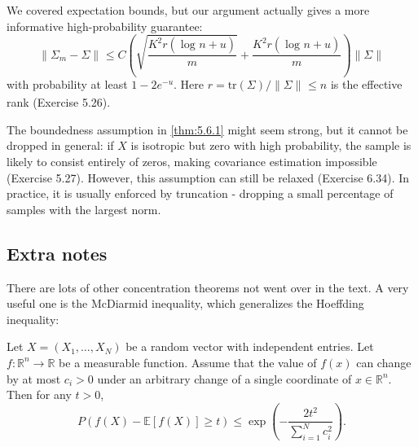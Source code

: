 \begin{remark}
\label{rmk:5.6.5}
We covered expectation bounds, but our argument actually gives a more informative high-probability guarantee:
\[ \lVert \Sigma_m - \Sigma \rVert_{} \leq C \left( 
\sqrt{\frac{K^2 r (\log_{}{n} + u)}{m}} + \frac{K^2 r (\log_{}{n} + u)}{m}\right) \lVert \Sigma \rVert_{} \]
with probability at least $1 - 2e^{-u}$. Here $r = \mathrm{tr}(\Sigma) / \lVert \Sigma \rVert_{} \leq n$ is 
the effective rank (Exercise 5.26).
\end{remark}

\begin{remark}
\label{rmk:5.6.6}
The boundedness assumption in \cref{thm:5.6.1} might seem strong, but it cannot be dropped in general: if $X$ 
is isotropic but zero with high probability, the sample is likely to consist entirely of zeros, making 
covariance estimation impossible (Exercise 5.27). However, this assumption can still be relaxed (Exercise 6.34). 
In practice, it is usually enforced by truncation - dropping a small percentage of samples with the largest norm.
\end{remark}



\subsection{Extra notes}
There are lots of other concentration theorems not went over in the text. A very useful one is the McDiarmid 
inequality, which generalizes the Hoeffding inequality:

\begin{theorem}
\label{thm:5.7.1}
Let $X = (X_1, \dots, X_N)$ be a random vector with independent entries. Let $f: \mathbb{R}^n \to \mathbb{R}$ 
be a measurable function. Assume that the value of $f(x)$ can change by at most $c_i > 0$ under an arbitrary 
change of a single coordinate of $x \in \mathbb{R}^n$. Then for any $t > 0$, 
\[ P(f(X) - \mathbb{E}[f(X)] \geq t) \leq \exp{\left( -\frac{2t^2}{\sum_{i = 1}^{N}c_i^2} \right)}. \]
\end{theorem}
